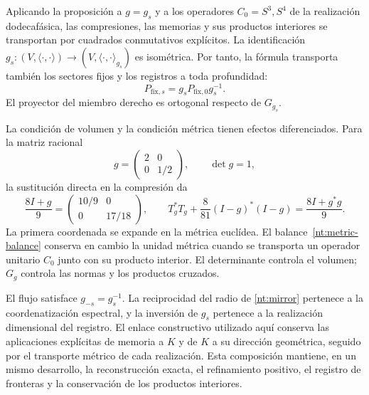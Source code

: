 Aplicando la proposición a \(g=g_s\) y a los operadores
\(C_0=S^3,S^4\) de la realización dodecafásica, las
compresiones, las memorias y sus productos interiores
se transportan por cuadrados conmutativos explícitos.
La identificación \(g_s:(V,\langle\cdot,\cdot\rangle)
\to(V,\langle\cdot,\cdot\rangle_{g_s})\) es isométrica.
Por tanto, la fórmula transporta también los sectores
fijos y los registros a toda profundidad:
\[
 P_{\mathrm{fix},s}
 =g_sP_{\mathrm{fix},0}g_s^{-1}.
\]
El proyector del miembro derecho es ortogonal respecto
de \(G_{g_s}\).

La condición de volumen y la condición métrica tienen
efectos diferenciados. Para la matriz racional
\[
 g=\begin{pmatrix}2&0\\0&1/2\end{pmatrix},
 \qquad \det g=1,
\]
la sustitución directa en la compresión da
\[
 \frac{8I+g}{9}
 =\begin{pmatrix}10/9&0\\0&17/18\end{pmatrix},
 \qquad
 T_g^*T_g+\frac8{81}(I-g)^*(I-g)
 =\frac{8I+g^*g}{9}.
\]
La primera coordenada se expande en la métrica
euclídea. El balance~\eqref{nt:metric-balance}
conserva en cambio la unidad métrica cuando se
transporta un operador unitario \(C_0\) junto con
su producto interior. El determinante controla
el volumen; \(G_g\) controla las normas y los
productos cruzados.

El flujo satisface \(g_{-s}=g_s^{-1}\).
La reciprocidad del radio de
\eqref{nt:mirror} pertenece a la coordenatización espectral,
y la inversión de \(g_s\) pertenece a la
realización dimensional del registro. El enlace
constructivo utilizado aquí conserva las
aplicaciones explícitas de memoria a \(K\) y de
\(K\) a su dirección geométrica, seguido por
el transporte métrico de cada realización.
Esta composición mantiene, en un mismo desarrollo,
la reconstrucción exacta, el refinamiento positivo,
el registro de fronteras y la conservación
de los productos interiores.
